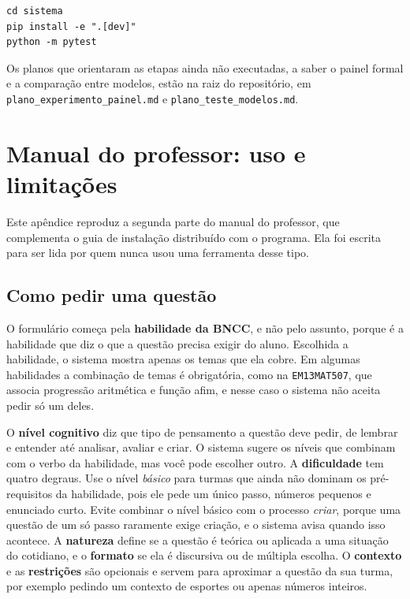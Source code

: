 \begin{verbatim}
cd sistema
pip install -e ".[dev]"
python -m pytest
\end{verbatim}

Os planos que orientaram as etapas ainda não executadas, a saber o painel formal e a comparação
entre modelos, estão na raiz do repositório, em \texttt{plano\_experimento\_painel.md} e
\texttt{plano\_teste\_modelos.md}.

\chapter{Manual do professor: uso e limitações}
\label{ap:manual}

Este apêndice reproduz a segunda parte do manual do professor, que complementa o guia de instalação
distribuído com o programa. Ela foi escrita para ser lida por quem nunca usou uma ferramenta desse
tipo.

\section*{Como pedir uma questão}

O formulário começa pela \textbf{habilidade da BNCC}, e não pelo assunto, porque é a habilidade que
diz o que a questão precisa exigir do aluno. Escolhida a habilidade, o sistema mostra apenas os temas
que ela cobre. Em algumas habilidades a combinação de temas é obrigatória, como na
\texttt{EM13MAT507}, que associa progressão aritmética e função afim, e nesse caso o sistema não
aceita pedir só um deles.

O \textbf{nível cognitivo} diz que tipo de pensamento a questão deve pedir, de lembrar e entender até
analisar, avaliar e criar. O sistema sugere os níveis que combinam com o verbo da habilidade, mas
você pode escolher outro. A \textbf{dificuldade} tem quatro degraus. Use o nível \emph{básico} para
turmas que ainda não dominam os pré-requisitos da habilidade, pois ele pede um único passo, números
pequenos e enunciado curto. Evite combinar o nível básico com o processo \emph{criar}, porque uma
questão de um só passo raramente exige criação, e o sistema avisa quando isso acontece. A
\textbf{natureza} define se a questão é teórica ou aplicada a uma situação do cotidiano, e o
\textbf{formato} se ela é discursiva ou de múltipla escolha. O \textbf{contexto} e as
\textbf{restrições} são opcionais e servem para aproximar a questão da sua turma, por exemplo pedindo
um contexto de esportes ou apenas números inteiros.

